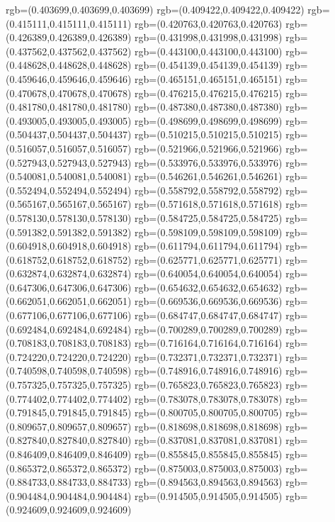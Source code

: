 {{{			rgb=(0.403699,0.403699,0.403699)
			rgb=(0.409422,0.409422,0.409422)
			rgb=(0.415111,0.415111,0.415111)
			rgb=(0.420763,0.420763,0.420763)
			rgb=(0.426389,0.426389,0.426389)
			rgb=(0.431998,0.431998,0.431998)
			rgb=(0.437562,0.437562,0.437562)
			rgb=(0.443100,0.443100,0.443100)
			rgb=(0.448628,0.448628,0.448628)
			rgb=(0.454139,0.454139,0.454139)
			rgb=(0.459646,0.459646,0.459646)
			rgb=(0.465151,0.465151,0.465151)
			rgb=(0.470678,0.470678,0.470678)
			rgb=(0.476215,0.476215,0.476215)
			rgb=(0.481780,0.481780,0.481780)
			rgb=(0.487380,0.487380,0.487380)
			rgb=(0.493005,0.493005,0.493005)
			rgb=(0.498699,0.498699,0.498699)
			rgb=(0.504437,0.504437,0.504437)
			rgb=(0.510215,0.510215,0.510215)
			rgb=(0.516057,0.516057,0.516057)
			rgb=(0.521966,0.521966,0.521966)
			rgb=(0.527943,0.527943,0.527943)
			rgb=(0.533976,0.533976,0.533976)
			rgb=(0.540081,0.540081,0.540081)
			rgb=(0.546261,0.546261,0.546261)
			rgb=(0.552494,0.552494,0.552494)
			rgb=(0.558792,0.558792,0.558792)
			rgb=(0.565167,0.565167,0.565167)
			rgb=(0.571618,0.571618,0.571618)
			rgb=(0.578130,0.578130,0.578130)
			rgb=(0.584725,0.584725,0.584725)
			rgb=(0.591382,0.591382,0.591382)
			rgb=(0.598109,0.598109,0.598109)
			rgb=(0.604918,0.604918,0.604918)
			rgb=(0.611794,0.611794,0.611794)
			rgb=(0.618752,0.618752,0.618752)
			rgb=(0.625771,0.625771,0.625771)
			rgb=(0.632874,0.632874,0.632874)
			rgb=(0.640054,0.640054,0.640054)
			rgb=(0.647306,0.647306,0.647306)
			rgb=(0.654632,0.654632,0.654632)
			rgb=(0.662051,0.662051,0.662051)
			rgb=(0.669536,0.669536,0.669536)
			rgb=(0.677106,0.677106,0.677106)
			rgb=(0.684747,0.684747,0.684747)
			rgb=(0.692484,0.692484,0.692484)
			rgb=(0.700289,0.700289,0.700289)
			rgb=(0.708183,0.708183,0.708183)
			rgb=(0.716164,0.716164,0.716164)
			rgb=(0.724220,0.724220,0.724220)
			rgb=(0.732371,0.732371,0.732371)
			rgb=(0.740598,0.740598,0.740598)
			rgb=(0.748916,0.748916,0.748916)
			rgb=(0.757325,0.757325,0.757325)
			rgb=(0.765823,0.765823,0.765823)
			rgb=(0.774402,0.774402,0.774402)
			rgb=(0.783078,0.783078,0.783078)
			rgb=(0.791845,0.791845,0.791845)
			rgb=(0.800705,0.800705,0.800705)
			rgb=(0.809657,0.809657,0.809657)
			rgb=(0.818698,0.818698,0.818698)
			rgb=(0.827840,0.827840,0.827840)
			rgb=(0.837081,0.837081,0.837081)
			rgb=(0.846409,0.846409,0.846409)
			rgb=(0.855845,0.855845,0.855845)
			rgb=(0.865372,0.865372,0.865372)
			rgb=(0.875003,0.875003,0.875003)
			rgb=(0.884733,0.884733,0.884733)
			rgb=(0.894563,0.894563,0.894563)
			rgb=(0.904484,0.904484,0.904484)
			rgb=(0.914505,0.914505,0.914505)
			rgb=(0.924609,0.924609,0.924609)
}}}
